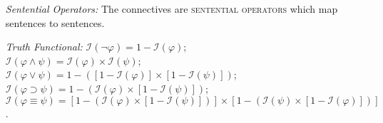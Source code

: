 \documentclass[a4paper, 11pt]{article} %
\def\therefore{\ensuremath{\ldotp\dot{}\,\ldotp}}
\newcommand{\I}{\mathcal{I}}
\begin{document}
\begin{enumerate}[leftmargin=1.5in,labelsep=.15in] %
  \item[\it Sentential Operators:] The connectives are \textsc{sentential operators} which map sentences to sentences.
  \item[\it Truth Functional:] $\I(\neg\varphi)=1-\I(\varphi)$;\\
    $\I(\varphi\wedge\psi)=\I(\varphi)\times\I(\psi)$;\\
    $\I(\varphi\vee\psi)=1-([1-\I(\varphi)]\times[1-\I(\psi)])$;\\
    $\I(\varphi\supset\psi)=1-(\I(\varphi)\times[1-\I(\psi)])$;\\
    \mbox{$\I(\varphi\equiv\psi)=[1-(\I(\varphi)\times[1-\I(\psi)])]\times[1-(\I(\psi)\times[1-\I(\varphi)])]$.}
\end{enumerate}




%
%
%
%
%
%
%
%
%








%
\end{document}

